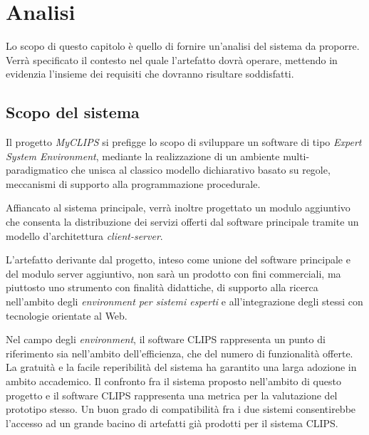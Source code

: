 
\chapter{Analisi}

Lo scopo di questo capitolo è quello di fornire un'analisi del sistema da proporre. Verrà specificato il contesto nel quale l'artefatto dovrà operare, mettendo in evidenzia l'insieme dei requisiti che dovranno risultare soddisfatti. 

\section{Scopo del sistema}

Il progetto \emph{MyCLIPS} si prefigge lo scopo di sviluppare un software di tipo \emph{Expert System Environment}, mediante la realizzazione di un ambiente multi-paradigmatico che unisca al classico modello dichiarativo basato su regole, meccanismi di  supporto alla programmazione procedurale.


Affiancato al sistema principale, verrà inoltre progettato un modulo aggiuntivo che consenta la distribuzione dei servizi offerti dal software principale tramite un modello d'architettura \emph{client-server}.

L'artefatto derivante dal progetto, inteso come unione del software principale e del modulo server aggiuntivo, non sarà un prodotto con fini commerciali, ma piuttosto uno strumento con finalità didattiche, di supporto alla ricerca nell'ambito degli \emph{environment per sistemi esperti} e all'integrazione degli stessi con tecnologie orientate al Web.

Nel campo degli \emph{environment}, il software CLIPS rappresenta un punto di riferimento sia nell'ambito dell'efficienza, che del numero di funzionalità offerte. La gratuità e la facile reperibilità del sistema ha garantito una larga adozione in ambito accademico. Il confronto fra il sistema proposto nell'ambito di questo progetto e il software CLIPS rappresenta una metrica per la valutazione del prototipo stesso. Un buon grado di compatibilità fra i due sistemi consentirebbe l'accesso ad un grande bacino di artefatti già prodotti per il sistema CLIPS.

%


